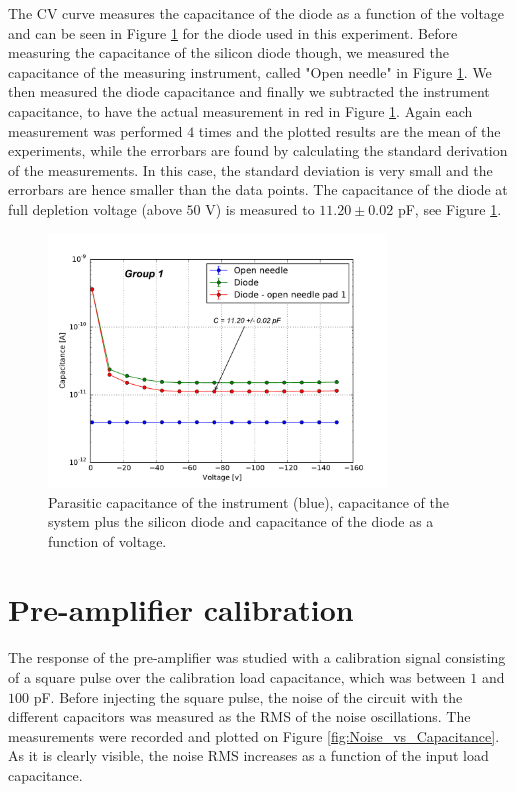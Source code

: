 \documentclass[12pt]{article}
\begin{document}
The CV curve measures the capacitance of the diode as a function of the voltage and can be seen in Figure \ref{fig:VC_curve_single} for the diode used in this experiment. Before measuring the capacitance of the silicon diode though, we measured the capacitance of the measuring instrument, called "Open needle" in Figure \ref{fig:VC_curve_single}. We then measured the diode capacitance and finally we subtracted the instrument capacitance, to have the actual measurement in red in Figure \ref{fig:VC_curve_single}. Again each measurement was performed $4$ times and the plotted results are the mean of the experiments, while the errorbars are found by calculating the standard derivation of the measurements. In this case, the standard deviation is very small and the errorbars are hence smaller than the data points. The capacitance of the diode at full depletion voltage (above $50$ V) is measured to $11.20 \pm 0.02$ pF, see Figure \ref{fig:VC_curve_single}.

\begin{figure}[t!]
  \centering
  \includegraphics[width=0.8\textwidth]{./graphics/V_vs_C}
  \caption{Parasitic capacitance of the instrument (blue), capacitance of the system plus the silicon diode and capacitance of the diode as a function of voltage.}
  \label{fig:VC_curve_single}
\end{figure}

\section{Pre-amplifier calibration}

The response of the pre-amplifier was studied with a calibration signal consisting of a square pulse over the calibration load capacitance, which was between $1$ and $100$ pF. 
Before injecting the square pulse, the noise of the circuit with the different capacitors was measured as the RMS of the noise oscillations. The measurements were recorded and plotted on Figure \ref{fig:Noise_vs_Capacitance}. As it is clearly visible, the noise RMS increases as a function of the input load capacitance.
%
%
\end{document}
